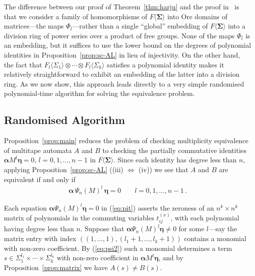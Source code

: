 \documentclass[runningheads]{llncs}
\newcommand{\valpha}{\boldsymbol{\alpha}}
\newcommand{\veta}{\boldsymbol{\eta}}
\begin{document}
\begin{remark}
  The difference between our proof of Theorem~\ref{thm:harju} and the
  proof in~\cite{HarjuK91} is that we consider a family of
  homomorphisms of $F \langle \boldsymbol{\Sigma} \rangle$ into Ore
  domains of matrices---the maps $\Phi_l$---rather than a single
  ``global'' embedding of $F \langle \boldsymbol{\Sigma} \rangle$ into
  a division ring of power series over a product of free groups.  None
  of the maps $\Phi_l$ is an embedding, but it suffices to use the
  lower bound on the degrees of polynomial identities in
  Proposition~\ref{prop:sc-AL} in lieu of injectivity.  On the other
  hand, the fact that $F_l \langle \Sigma_1 \rangle \otimes \cdots
  \otimes F_l \langle \Sigma_k \rangle$ satisfies a polynomial identity
  makes it relatively straightforward to exhibit an embedding of the
  latter into a division ring.  As we now show, this approach leads
  directly to a very simple randomised polynomial-time algorithm for
  solving the equivalence problem.
\label{rem:difference}
\end{remark}

\subsection{Randomised Algorithm}

Proposition~\ref{prop:main} reduces the problem of checking
multiplicity equivalence of multitape automata $A$ and $B$ to checking
the partially commutative identities $\valpha M^l \veta = 0$, $l
=0,1,\ldots,n-1$ in $F \langle \boldsymbol{\Sigma} \rangle$.  Since
each identity has degree less than $n$, applying
Proposition~\ref{prop:sc-AL} ((iii) $\Leftrightarrow$ (iv)) we see
that $A$ and $B$ are equivalent if and only if
\begin{gather}
\valpha \, \Psi_n(M)^l \, \veta = 0 
\qquad
l=0,1,\ldots,n-1 \, .
\label{eq:pit}
\end{gather}

Each equation $\valpha \Psi_n(M)^l \veta=0$ in (\ref{eq:pit})
asserts the zeroness of an $n^k\times n^k$ matrix of polynomials in
the commuting variables $t^{(x)}_{ij}$, with each polynomial having degree
less than $n$.  Suppose that $\valpha  \Psi_n(M)^l \veta \neq 0$
for some $l$---say the matrix entry with index
$((1,\ldots,1),(l_1+1,\ldots,l_k+1))$ contains a monomial with non-zero
coefficient.  By (\ref{eq:psi2}) such a monomial determines a term $s
\in \Sigma_1^{l_1} \times \cdots \times \Sigma_k^{l_k}$ with non-zero
coefficient in $\valpha M^l \veta$, and by
Proposition~\ref{prop:matrix} we have $A(s)\neq B(s)$.
\end{document}
